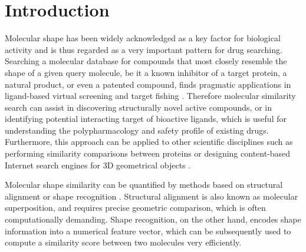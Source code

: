 \documentclass[a4,center,fleqn]{NAR}
\begin{document}
\section{Introduction}

Molecular shape has been widely acknowledged as a key factor for biological activity and is thus regarded as a very important pattern for drug searching. Searching a molecular database for compounds that most closely resemble the shape of a given query molecule, be it a known inhibitor of a target protein, a natural product, or even a patented compound, finds pragmatic applications in ligand-based virtual screening \cite{1332,1380,1281,1504,1502,1615} and target fishing \cite{1528,1407,1408,1402}. Therefore molecular similarity search can assist in discovering structurally novel active compounds, or in identifying potential interacting target of bioactive ligands, which is useful for understanding the polypharmacology and safety profile of existing drugs. Furthermore, this approach can be applied to other scientific disciplines such as performing similarity comparisons between proteins or designing content-based Internet search engines for 3D geometrical objects \cite{1280}.

Molecular shape similarity can be quantified by methods based on structural alignment \cite{1440,887,1439,1534} or shape recognition \cite{1379,1338,1331,1675}. Structural alignment is also known as molecular superposition, and requires precise geometric comparison, which is often computationally demanding. Shape recognition, on the other hand, encodes shape information into a numerical feature vector, which can be subsequently used to compute a similarity score between two molecules very efficiently.
\end{document}
